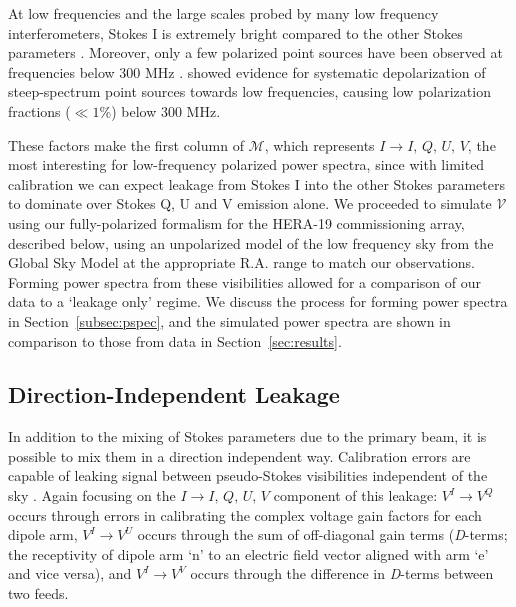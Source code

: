 \documentclass[twocolumn, trackchanges]{aastex61}
\begin{document}
At low frequencies and the large scales probed by many low frequency interferometers, Stokes I is extremely bright compared to the other Stokes parameters \citep{Bernardi.09, Bernardi.10, Jelic.14, Jelic.15, Asad15, Kohn16, Lenc.17, Moore17}. Moreover, only a few polarized point sources have been observed at frequencies below 300 MHz \citep{Bernardi.13, Asad.16, Lenc.17}. \cite{Farnes.14} showed evidence for systematic depolarization of steep-spectrum point sources towards low frequencies, causing low polarization fractions ($\ll 1\%$) below 300 MHz. 

These factors make the first column of $\mathcal{M}$, which represents $I\rightarrow I,\,Q,\,U,\,V$, the most interesting for low-frequency polarized power spectra, since with limited calibration we can expect leakage from Stokes I into the other Stokes parameters to dominate over Stokes Q, U and V emission alone. We proceeded to simulate $\mathcal{V}$ using our fully-polarized formalism for the HERA-19 commissioning array, described below, using an unpolarized model of the low frequency sky from the Global Sky Model \citep[GSM;][]{GSM.08, pygsm, GSM.17} at the appropriate R.A. range to match our observations. Forming power spectra from these visibilities allowed for a comparison of our data to a `leakage only' regime. We discuss the process for forming power spectra in Section~\ref{subsec:pspec}, and the simulated power spectra are shown in comparison to those from data in Section~\ref{sec:results}.

\subsection{Direction-Independent Leakage}
\label{subsec:DI-Leak}

In addition to the mixing of Stokes parameters due to the primary beam, it is possible to mix them in a direction independent way. Calibration errors are capable of leaking signal between pseudo-Stokes visibilities independent of the sky \citep{TMS}. Again focusing on the $I\rightarrow I,\,Q,\,U,\,V$ component of this leakage: $V^I \rightarrow V^Q$ occurs through errors in calibrating the complex voltage gain factors for each dipole arm, $V^I \rightarrow V^U$ occurs through the sum of off-diagonal gain terms (\textit{D}-terms; the receptivity of dipole arm `n' to an electric field vector aligned with arm `e' and vice versa), and $V^I \rightarrow V^V$ occurs through the difference in \textit{D}-terms between two feeds. 
\end{document}
